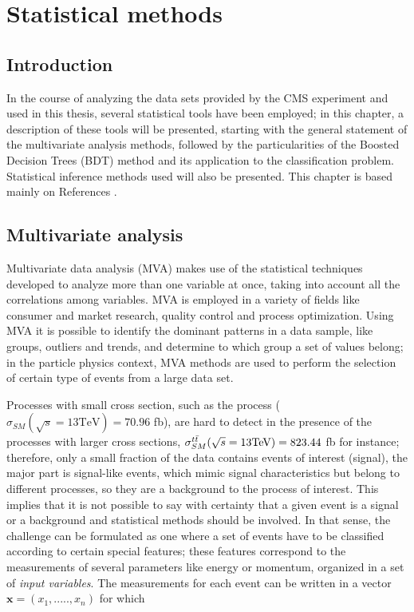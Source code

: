 \setcounter{chapter}{4}
\chapter{Statistical methods}\label{ch:stat}

\section{Introduction}

In the course of analyzing the data sets provided by the CMS experiment and used in this thesis, several statistical tools have been employed; in this chapter, a description of these tools will be presented, starting with the general statement of the multivariate analysis methods, followed by the particularities of the Boosted Decision Trees (BDT) method and its application to the classification problem. Statistical inference methods used will also be presented. This chapter is based mainly on References \cite{mva, tmva, luca}.      

\section{Multivariate analysis}\label{sec:mva}

Multivariate data analysis (MVA) makes use of the statistical techniques developed to analyze more than one variable at once, taking into account all the correlations among variables. MVA is employed in a variety of fields like consumer and market research, quality control and process optimization. Using MVA it is possible to identify the dominant patterns in a data sample, like groups, outliers and trends, and determine to which group a set of values belong; in the particle physics context, MVA methods are used to perform the selection of certain type of events from a large data set.

Processes with small cross section, such as the \tHq process ($\sigma_{SM}(\sqrt{s}=13 \textrm{TeV})=70.96$ fb), are hard to detect in the presence of the processes with larger cross sections, $\sigma_{SM}^{t\bar{t}}(\sqrt{s}=13 \textrm{TeV})=823.44$ fb for instance; therefore, only a small fraction of the data contains events of interest (signal), the major part is signal-like events, which mimic signal characteristics but belong to different processes, so they are a background to the process of interest. This implies that it is not possible to say with certainty that a given event is a signal or a background and statistical methods should be involved. In that sense, the challenge can be formulated as one where a set of events have to be classified according to certain special features; these features correspond to the measurements of several parameters like energy or momentum, organized in a set of \textit{input variables}. The measurements for each event can be written in a vector $\textbf{x}=(x_1,.....,x_n)$ for which

